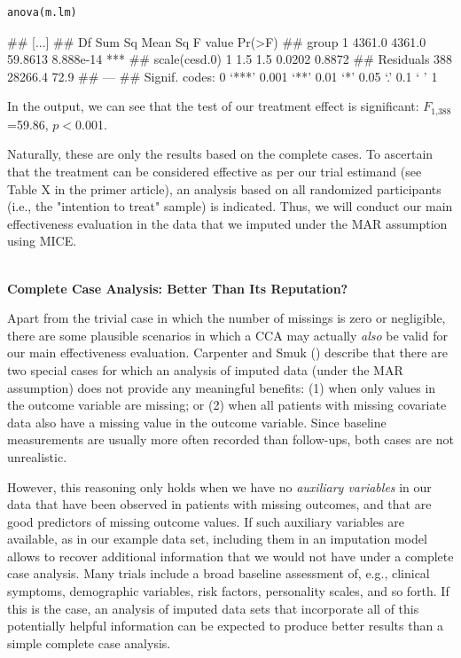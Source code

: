 \begin{lstlisting}
anova(m.lm)
\end{lstlisting}

\begin{example}
## [...]
##                Df  Sum Sq Mean Sq F value    Pr(>F)    
## group           1  4361.0  4361.0 59.8613 8.888e-14 ***
## scale(cesd.0)   1     1.5     1.5  0.0202    0.8872    
## Residuals     388 28266.4    72.9                      
## ---
## Signif. codes:  0 ‘***’ 0.001 ‘**’ 0.01 ‘*’ 0.05 ‘.’ 0.1 ‘ ’ 1
\end{example}

In the output, we can see that the test of our treatment effect is significant: $F_{\text{1,388}}$=59.86, $p<$0.001.

Naturally, these are only the results based on the complete cases. To ascertain that the treatment can be considered effective as per our trial estimand (see Table X in the primer article), an analysis based on all randomized participants (i.e., the "intention to treat" sample) is indicated. Thus, we will conduct our main effectiveness evaluation in the data that we imputed under the MAR assumption using \textsf{MICE}.

\begin{box-important} \\
\textcolor{burgundyred}{\textbf{Complete Case Analysis: Better Than Its Reputation?}} 

\vspace{2mm}

Apart from the trivial case in which the number of missings is zero or negligible, there are some plausible scenarios in which a CCA may actually \emph{also} be valid for our main effectiveness evaluation. Carpenter and Smuk (\citeyear{carpenter2021missing}) describe that there are two special cases for which an analysis of imputed data (under the MAR assumption) does not provide any meaningful benefits: (1) when only values in the outcome variable are missing; or (2) when all patients with missing covariate data also have a missing value in the outcome variable. Since baseline measurements are usually more often recorded than follow-ups, both cases are not unrealistic. 

\vspace{2mm}

\hspace*{5mm} However, this reasoning only holds when we have no \emph{auxiliary variables} in our data that have been observed in patients with missing outcomes, and that are good predictors of missing outcome values. If such auxiliary variables are available, as in our example data set, including them in an imputation model allows to recover additional information that we would not have under a complete case analysis. Many trials include a broad baseline assessment of, e.g., clinical symptoms, demographic variables, risk factors, personality scales, and so forth. If this is the case, an analysis of imputed data sets that incorporate all of this potentially helpful information can be expected to produce better results than a simple complete case analysis. 

\end{box-important}


